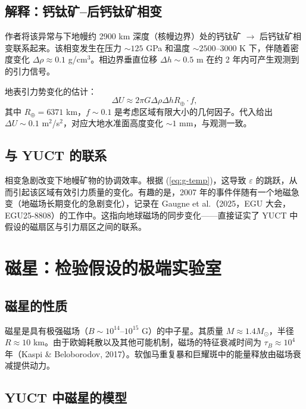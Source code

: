 \documentclass[12pt]{article}
\theoremstyle{remark}
\newcommand{\eps}{\varepsilon}
\begin{document}
	\subsection{解释：钙钛矿–后钙钛矿相变}
	\label{subsec:grace-interpretation}
	
	作者将该异常与下地幔约 2900 km 深度（核幔边界）处的钙钛矿 $\rightarrow$ 后钙钛矿相变联系起来。该相变发生在压力 $\sim 125$ GPa 和温度 $\sim 2500$–$3000$ K 下，伴随着密度变化 $\Delta\rho \approx 0.1$ g/cm$^3$。相边界垂直位移 $\Delta h \sim 0.5$ m 在约 2 年内可产生观测到的引力信号。
	
	地表引力势变化的估计：
	\begin{equation}
		\Delta U \approx 2\pi G \Delta\rho \Delta h R_\oplus \cdot f,
		\label{eq:delta-u}
	\end{equation}
	其中 $R_\oplus = 6371$ km，$f \sim 0.1$ 是考虑区域有限大小的几何因子。代入给出 $\Delta U \sim 0.1$ m$^2$/s$^2$，对应大地水准面高度变化 $\sim 1$ mm，与观测一致。
	
	\subsection{与 YUCT 的联系}
	\label{subsec:grace-yuct}
	
	相变急剧改变下地幔矿物的协调效率。根据 (\ref{eq:g-temp})，这导致 $\eps$ 的跳跃，从而引起该区域有效引力质量的变化。有趣的是，2007 年的事件伴随有一个地磁急变（地磁场长期变化的急剧变化），记录在 Gaugne et al.（2025，EGU 大会，EGU25-8808）的工作中。这指向地球磁场的同步变化——直接证实了 YUCT 中假设的磁扇区与引力扇区之间的联系。
	
	\section{磁星：检验假设的极端实验室}
	\label{sec:magnetars}
	
	\subsection{磁星的性质}
	\label{subsec:magnetars-properties}
	
	磁星是具有极强磁场（$B \sim 10^{14}$–$10^{15}$ G）的中子星。其质量 $M \approx 1.4 M_\odot$，半径 $R \approx 10$ km。由于欧姆耗散以及其他可能机制，磁场的特征衰减时间为 $\tau_B \approx 10^4$ 年（Kaspi \& Beloborodov, 2017）。软伽马重复暴和巨耀斑中的能量释放由磁场衰减提供动力。
	
	\subsection{YUCT 中磁星的模型}
	\label{subsec:magnetars-model}
	
\end{document}
